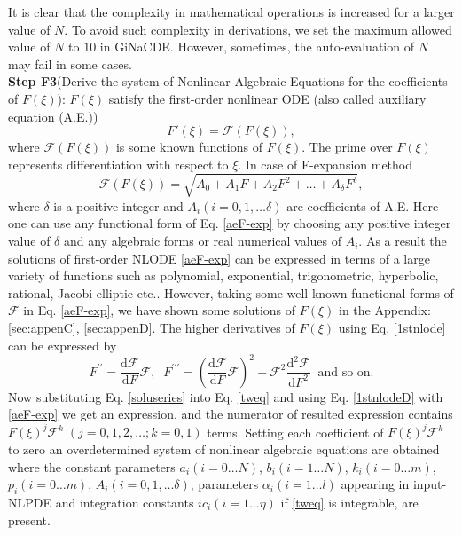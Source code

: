 \documentclass[prd,aps,floats,showkeys,nofootinbib,notitlepage]{revtex4-2}
\begin{document}
	It is clear that the complexity in mathematical operations is increased for a larger value of $N$. To avoid such complexity in derivations, we set the maximum allowed value of $N$ to $10$ in GiNaCDE. However, sometimes, the auto-evaluation of $N$ may fail in some cases. \\
	
	
	\textbf{Step F3}(Derive the system of Nonlinear Algebraic Equations for the coefficients of $F(\xi)$):
	$F(\xi)$ satisfy the first-order nonlinear ODE (also called auxiliary equation (A.E.))
	\begin{equation}\label{1stnlode}
		{F'\left( \xi  \right)} = \mathcal{F}(F(\xi)),
	\end{equation}
	where $\mathcal{F}(F(\xi))$ is some known functions of $F(\xi)$. The prime over $F(\xi)$ represents differentiation with respect to $\xi$. In case of F-expansion method
	\begin{equation} \label{aeF-exp}
		\mathcal{F}(F(\xi)) = \sqrt{{A_0} + {A_1}F + {A_2}{F^2} +  \ldots + {A_\delta }{F^\delta }},
	\end{equation}
	where $\delta$ is a positive integer and $A_i(i=0,1,\ldots \delta)$ are coefficients of A.E. Here one can use any functional form of Eq. \eqref{aeF-exp} by choosing any positive integer value of $\delta$ and any algebraic forms or real numerical values of $A_i$. As a result the solutions of first-order NLODE \eqref{aeF-exp} can be expressed in terms of a large variety of functions such as polynomial, exponential, trigonometric, hyperbolic, rational, Jacobi elliptic etc.. 
	However, taking some well-known functional forms of $\mathcal{F}$ in Eq. \eqref{aeF-exp}, we have shown some solutions of $F(\xi)$ in the Appendix: \ref{sec:appenC}, \ref{sec:appenD}. The higher derivatives of $F(\xi)$ using Eq. \eqref{1stnlode} can be expressed by
	\begin{equation}\label{1stnlodeD}
		F^{\prime\prime}= \frac{\mathrm{d} \mathcal{F} }{\mathrm{d}F}\mathcal{F},\;\;F^{\prime\prime\prime}=\left(\frac{\mathrm{d} \mathcal{F} }{\mathrm{d}F}\mathcal{F}\right)^2+\mathcal{F}^2\frac{\mathrm{d^2} \mathcal{F} }{\mathrm{d}F^2}\;\; \text{and so on.}
	\end{equation}
	Now substituting Eq. \eqref{soluseries} into Eq. \eqref{tweq} and using Eq. \eqref{1stnlodeD} with \eqref{aeF-exp} we get an expression, and the numerator of resulted expression contains $F(\xi)^j{\mathcal{F}}^k\;(j=0,1,2,\ldots;k=0,1)$ terms. Setting each coefficient of $F(\xi)^j{\mathcal{F}}^k$ to zero an overdetermined system of nonlinear algebraic equations are obtained where the constant parameters $a_i(i=0\ldots N)$, $b_i(i=1\ldots N)$, $k_i(i=0\ldots m)$, $p_i(i=0\ldots m)$, $A_i(i=0,1,\ldots \delta)$, parameters $\alpha_i(i=1\ldots l)$ appearing in input-NLPDE and integration constants $ic_i(i=1\ldots \eta)$ if \eqref{tweq} is integrable, are present. 
	
\end{document}
